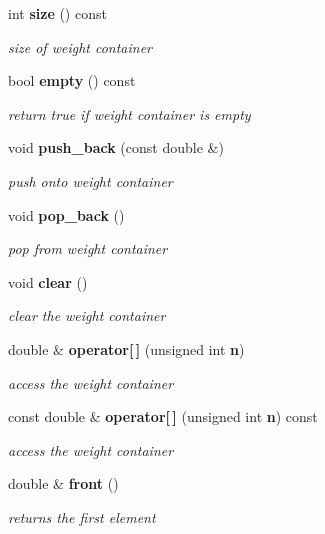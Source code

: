 \begin{CompactItemize}
int {\bf size} () const
\begin{CompactList}\small\item\em size of weight container \item\end{CompactList}\item 
bool {\bf empty} () const
\begin{CompactList}\small\item\em return true if weight container is empty \item\end{CompactList}\item 
void {\bf push\_\-back} (const double \&)
\begin{CompactList}\small\item\em push onto weight container \item\end{CompactList}\item 
void {\bf pop\_\-back} ()
\begin{CompactList}\small\item\em pop from weight container \item\end{CompactList}\item 
void {\bf clear} ()
\begin{CompactList}\small\item\em clear the weight container \item\end{CompactList}\item 
double \& {\bf operator[$\,$]} (unsigned int {\bf n})
\begin{CompactList}\small\item\em access the weight container \item\end{CompactList}\item 
const double \& {\bf operator[$\,$]} (unsigned int {\bf n}) const
\begin{CompactList}\small\item\em access the weight container \item\end{CompactList}\item 
double \& {\bf front} ()
\begin{CompactList}\small\item\em returns the first element \item\end{CompactList}\item 

\end{CompactItemize}
